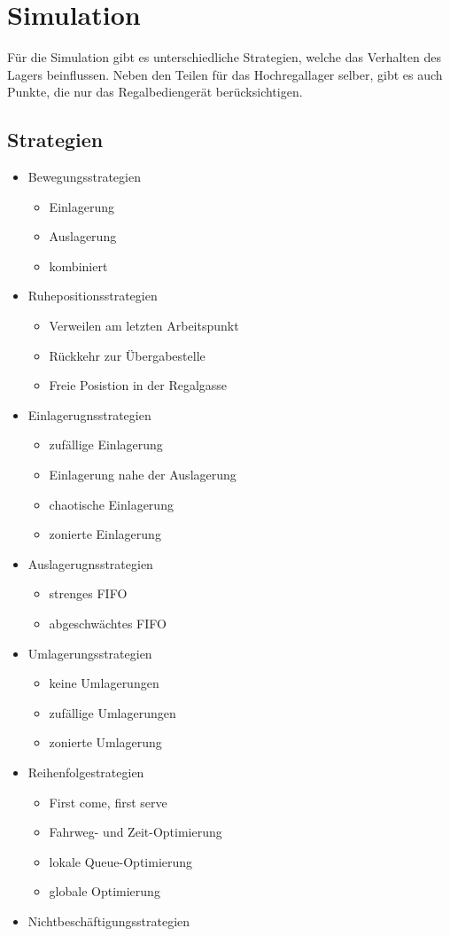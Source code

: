 \section{Simulation}
Für die Simulation gibt es unterschiedliche Strategien, welche das Verhalten des Lagers beinflussen. Neben den Teilen für das Hochregallager selber, gibt es auch Punkte, die nur das Regalbediengerät berücksichtigen.
%
\subsection{Strategien}
\begin{itemize}
 \item Bewegungsstrategien
 \begin{itemize}
  \item Einlagerung
  \item Auslagerung
  \item kombiniert
\end{itemize}
 \item Ruhepositionsstrategien
 \begin{itemize}
  \item Verweilen am letzten Arbeitspunkt
  \item Rückkehr zur Übergabestelle
  \item Freie Posistion in der Regalgasse
\end{itemize}
 \item Einlagerugnsstrategien
 \begin{itemize}
  \item zufällige Einlagerung
  \item Einlagerung nahe der Auslagerung
  \item chaotische Einlagerung
  \item zonierte Einlagerung
\end{itemize}
 \item Auslagerugnsstrategien
 \begin{itemize}
  \item strenges FIFO
  \item abgeschwächtes FIFO
\end{itemize}
 \item Umlagerungsstrategien
 \begin{itemize}
  \item keine Umlagerungen
  \item zufällige Umlagerungen
  \item zonierte Umlagerung
\end{itemize}
 \item Reihenfolgestrategien
 \begin{itemize}
  \item First come, first serve
  \item Fahrweg- und Zeit-Optimierung
  \item lokale Queue-Optimierung
  \item globale Optimierung
\end{itemize}
 \item Nichtbeschäftigungsstrategien
\end{itemize}




